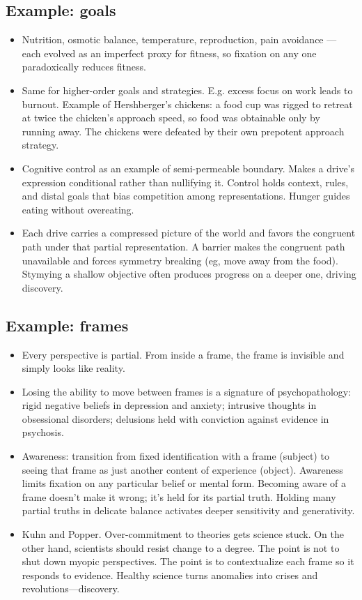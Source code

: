 \documentclass[11pt]{article}
\begin{document}
\subsection*{Example: goals}

\begin{itemize}
  \item Nutrition, osmotic balance, temperature, reproduction, pain avoidance --- each evolved as an imperfect proxy for fitness, so fixation on any one paradoxically reduces fitness. 
  \item Same for higher-order goals and strategies. E.g. excess focus on work leads to burnout. Example of Hershberger's chickens: a food cup was rigged to retreat at twice the chicken's approach speed, so food was obtainable only by running away. The chickens were defeated by their own prepotent approach strategy.
  \item Cognitive control as an example of semi-permeable boundary. Makes a drive's expression conditional rather than nullifying it. Control holds context, rules, and distal goals that bias competition among representations. Hunger guides eating without overeating.
  \item Each drive carries a compressed picture of the world and favors the congruent path under that partial representation. A barrier makes the congruent path unavailable and forces symmetry breaking (eg, move away from the food). Stymying a shallow objective often produces progress on a deeper one, driving discovery.
\end{itemize}

\subsection*{Example: frames}

\begin{itemize}
  \item Every perspective is partial. From inside a frame, the frame is invisible and simply looks like reality.
  \item Losing the ability to move between frames is a signature of psychopathology: rigid negative beliefs in depression and anxiety; intrusive thoughts in obsessional disorders; delusions held with conviction against evidence in psychosis.
  \item Awareness: transition from fixed identification with a frame (subject) to seeing that frame as just another content of experience (object). Awareness limits fixation on any particular belief or mental form. Becoming aware of a frame doesn't make it wrong; it's held for its partial truth. Holding many partial truths in delicate balance activates deeper sensitivity and generativity.
  \item Kuhn and Popper. Over-commitment to theories gets science stuck. On the other hand, scientists should resist change to a degree. The point is not to shut down myopic perspectives. The point is to contextualize each frame so it responds to evidence. Healthy science turns anomalies into crises and revolutions---discovery.
\end{itemize}
\end{document}
